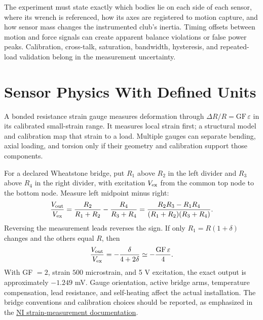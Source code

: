 The experiment must state exactly which bodies lie on each side of each sensor,
where its wrench is referenced, how its axes are registered to motion capture,
and how sensor mass changes the instrumented club's inertia. Timing offsets
between motion and force signals can create apparent balance violations or
false power peaks. Calibration, cross-talk, saturation, bandwidth, hysteresis,
and repeated-load validation belong in the measurement uncertainty.

\section{Sensor Physics With Defined Units}
\label{subsec:strain_gauges}

A bonded resistance strain gauge measures deformation through
$\Delta R/R=\mathrm{GF}\,\varepsilon$ in its calibrated small-strain range.
It measures local strain first; a structural model and calibration map that
strain to a load. Multiple gauges can separate bending, axial loading, and
torsion only if their geometry and calibration support those components.

For a declared Wheatstone bridge, put $R_1$ above $R_2$ in the left divider
and $R_3$ above $R_4$ in the right divider, with excitation $V_{\rm ex}$
from the common top node to the bottom node. Measure left midpoint minus right:
\begin{equation}
 \frac{V_{\rm out}}{V_{\rm ex}}
 =\frac{R_2}{R_1+R_2}-\frac{R_4}{R_3+R_4}
 =\frac{R_2R_3-R_1R_4}{(R_1+R_2)(R_3+R_4)}.
 \label{eq:wheatstone_output}
\end{equation}
Reversing the measurement leads reverses the sign. If only $R_1=R(1+\delta)$
changes and the others equal $R$, then
\begin{equation}
 \frac{V_{\rm out}}{V_{\rm ex}}=-\frac{\delta}{4+2\delta}
 \simeq-\frac{\mathrm{GF}\,\varepsilon}{4}.
 \label{eq:quarter_bridge_example}
\end{equation}
With GF $=2$, strain $500$ microstrain, and 5 V excitation, the exact output
is approximately $-1.249$ mV. Gauge orientation, active bridge arms, temperature
compensation, lead resistance, and self-heating affect the actual installation.
The bridge conventions and calibration choices should be reported, as emphasized
in the \href{https://www.ni.com/getting-started/set-up-hardware/data-acquisition/i/strain-gages}{NI strain-measurement documentation}.

